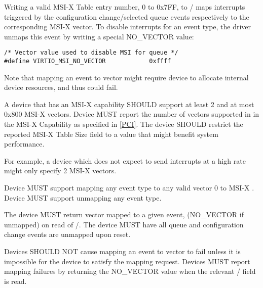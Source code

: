 Writing a valid MSI-X Table entry number, 0 to 0x7FF, to
/ maps interrupts triggered
by the configuration change/selected queue events respectively to
the corresponding MSI-X vector. To disable interrupts for an
event type, the driver unmaps this event by writing a special NO_VECTOR
value:

\begin{lstlisting}
/* Vector value used to disable MSI for queue */
#define VIRTIO_MSI_NO_VECTOR            0xffff
\end{lstlisting}

Note that mapping an event to vector might require device to
allocate internal device resources, and thus could fail. 


A device that has an MSI-X capability SHOULD support at least 2
and at most 0x800 MSI-X vectors.
Device MUST report the number of vectors supported in
 in the MSI-X Capability as specified in
\hyperref[intro:PCI]{[PCI]}.
The device SHOULD restrict the reported MSI-X Table Size field
to a value that might benefit system performance.
\begin{note}
For example, a device which does not expect to send
interrupts at a high rate might only specify 2 MSI-X vectors.
\end{note}
Device MUST support mapping any event type to any valid
vector 0 to MSI-X .
Device MUST support unmapping any event type.

The device MUST return vector mapped to a given event,
(NO_VECTOR if unmapped) on read of /.
The device MUST have all queue and configuration change
events are unmapped upon reset.

Devices SHOULD NOT cause mapping an event to vector to fail
unless it is impossible for the device to satisfy the mapping
request.  Devices MUST report mapping
failures by returning the NO_VECTOR value when the relevant
/ field is read. 


